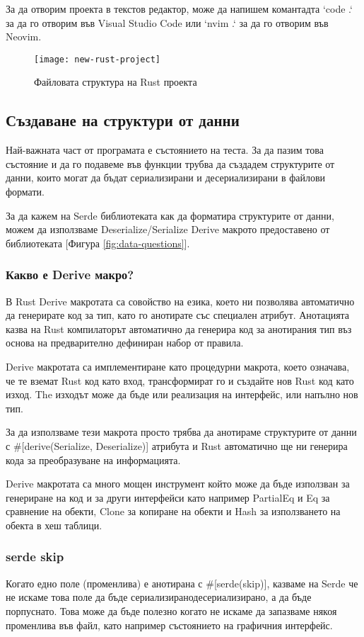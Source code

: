 За да отворим проекта в текстов редактор, може да напишем комантадта `code .` за
да го отворим във Visual Studio Code или `nvim .` за да го отворим във Neovim.
 
\begin{figure}[!htb]
  \texttt{[image: new-rust-project]}
  \centering
  \caption{Файловата структура на Rust проекта}
  \label{fig:new-rust-project}
\end{figure}



\subsection{Създаване на структури от данни}
Най-важната част от програмата е състоянието на теста. За да пазим това състояние
и да го подавеме във функции трубва да създадем структурите от данни, които могат
да бъдат сериализирани и десериализирани в файлови формати.

За да кажем на Serde библиотеката как да форматира структурите от данни, можем
да използваме Deserialize/Serialize Derive макрото предоставено от библиотеката
[Фигура \ref{fig:data-questions}].

\subsubsection{Какво е Derive макро?}
В Rust Derive макротата са совойство на езика, което ни позволява автоматично
да генерирате код за тип, като го анотирате със специален атрибут. Анотацията
казва на Rust компилаторът автоматично да генерира код за анотирания тип въз
основа на предварително дефиниран набор от правила.

Derive макротата са имплементиране като процедурни макрота, което означава, че
те вземат Rust код като вход, трансформират го и създайте нов Rust код като
изход. The изходът може да бъде или реализация на интерфейс, или напълно нов
тип.

За да използваме тези макрота просто трябва да анотираме структурите от данни
с \#[derive(Serialize, Deserialize)] атрибута и Rust автоматично ще ни генерира
кода за преобразуване на информацията.

Derive макротата са много мощен инструмент който може да бъде използван за генериране
на код и за други интерфейси като например PartialEq и Eq за сравнение на обекти,
Clone за копиране на обекти и Hash за използването на обекта в хеш таблици.

\subsubsection{serde skip}
Когато едно поле (променлива) е анотирана с \#[serde(skip)], казваме на Serde че
не искаме това поле да бъде сериализирано\/десериализирано, а да бъде порпуснато.
Това може да бъде полезно когато не искаме да запазваме някоя променлива във файл,
като например състоянието на графичния интерфейс.

